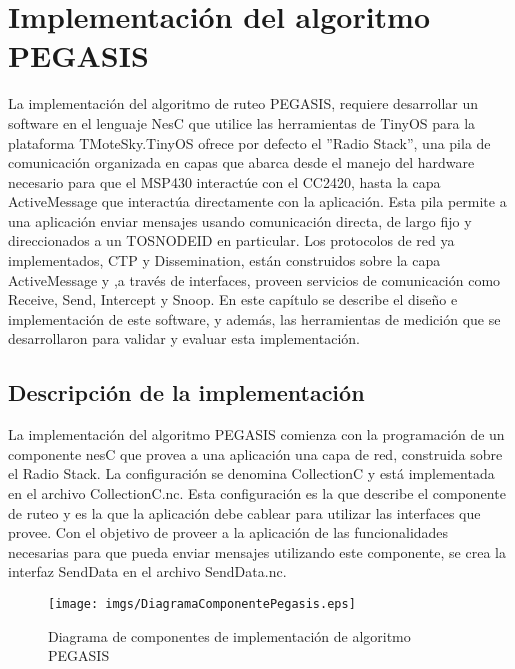 \chapter{Implementación del algoritmo PEGASIS}
La implementación del algoritmo de ruteo PEGASIS, requiere desarrollar un software en el lenguaje NesC que utilice las herramientas de TinyOS para la plataforma TMoteSky.TinyOS ofrece por defecto el ''Radio Stack'', una pila de comunicación organizada en capas que abarca desde el manejo del hardware necesario para que el MSP430 interactúe con el CC2420, hasta la capa ActiveMessage que interactúa directamente con la aplicación. Esta pila permite a una aplicación enviar mensajes usando comunicación directa, de largo fijo y direccionados a un TOS\textunderscore NODE\textunderscore ID en particular. Los protocolos de red ya implementados, CTP y Dissemination, están construidos sobre la capa ActiveMessage y ,a través de interfaces, proveen servicios de comunicación como Receive, Send, Intercept y Snoop. En este capítulo se describe el diseño e implementación de este software, y además, las herramientas de medición que se desarrollaron para validar y evaluar esta implementación. 

\section{Descripción de la implementación}
La implementación del algoritmo PEGASIS comienza con la programación de un componente nesC que provea a una aplicación una capa de red, construida sobre el Radio Stack. La configuración se denomina CollectionC y está implementada en el archivo CollectionC.nc. Esta configuración es la que describe el componente de ruteo y es la que la aplicación debe cablear para utilizar las interfaces que provee. Con el objetivo de proveer a la aplicación de las funcionalidades necesarias para que pueda enviar mensajes utilizando este componente, se crea la interfaz SendData en el archivo SendData.nc.




\begin{figure}[H]
  \centering
 \texttt{[image: imgs/DiagramaComponentePegasis.eps]}
 \caption{Diagrama de componentes de implementación de algoritmo PEGASIS}
\end{figure}

